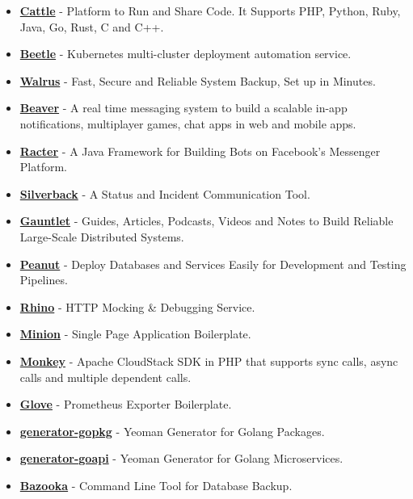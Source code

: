 \documentclass[paper=a4,fontsize=11pt]{scrartcl} %
\begin{document}
\begin{itemize}
\item \textbf{\href{https://github.com/Clivern/Cattle}{Cattle}} - Platform to Run and Share Code. It Supports PHP, Python, Ruby, Java, Go, Rust, C and C++.
\item \textbf{\href{https://github.com/Clivern/Beetle}{Beetle}} - Kubernetes multi-cluster deployment automation service.
\item \textbf{\href{https://github.com/Clivern/Walrus}{Walrus}} - Fast, Secure and Reliable System Backup, Set up in Minutes.
\item \textbf{\href{https://github.com/Clivern/Beaver}{Beaver}} - A real time messaging system to build a scalable in-app notifications, multiplayer games, chat apps in web and mobile apps.
\item \textbf{\href{https://github.com/Clivern/Racter}{Racter}} - A Java Framework for Building Bots on Facebook's Messenger Platform.
\item \textbf{\href{https://github.com/silverbackhq}{Silverback}} - A Status and Incident Communication Tool.
\item \textbf{\href{https://github.com/Clivern/Gauntlet}{Gauntlet}} - Guides, Articles, Podcasts, Videos and Notes to Build Reliable Large-Scale Distributed Systems.
\item \textbf{\href{https://github.com/Clivern/Peanut}{Peanut}} - Deploy Databases and Services Easily for Development and Testing Pipelines.
\item \textbf{\href{https://github.com/Clivern/Rhino}{Rhino}} - HTTP Mocking \& Debugging Service.
\item \textbf{\href{https://github.com/Clivern/Minion}{Minion}} - Single Page Application Boilerplate.
\item \textbf{\href{https://github.com/Clivern/Monkey}{Monkey}} - Apache CloudStack SDK in PHP that supports sync calls, async calls and multiple dependent calls.
\item \textbf{\href{https://github.com/Clivern/Glove}{Glove}} - Prometheus Exporter Boilerplate.
\item \textbf{\href{https://github.com/Clivern/generator-gopkg}{generator-gopkg}} - Yeoman Generator for Golang Packages.
\item \textbf{\href{https://github.com/Clivern/generator-goapi}{generator-goapi}} - Yeoman Generator for Golang Microservices.
\item \textbf{\href{https://github.com/Clivern/Bazooka}{Bazooka}} - Command Line Tool for Database Backup.

\end{itemize}
\end{document}
